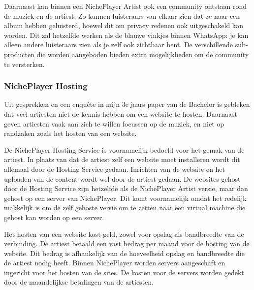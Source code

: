 Daarnaast kan binnen een NichePlayer Artist ook een community ontstaan rond de muziek en de artiest. Zo kunnen luisteraars van elkaar zien dat ze naar een album hebben geluisterd, hoewel dit om privacy redenen ook uitgeschakeld kan worden. Dit zal hetzelfde werken als de blauwe vinkjes binnen WhatsApp: je kan alleen andere luisteraars zien als je zelf ook zichtbaar bent. De verschillende sub-producten die worden aangeboden bieden extra mogelijkheden om de community te versterken.

\subsubsection*{NichePlayer Hosting}
Uit gesprekken en een enquête in mijn 3e jaars paper van de Bachelor is gebleken dat veel artiesten niet de kennis hebben om een website te hosten. Daarnaast geven artiesten vaak aan zich te willen focussen op de muziek, en niet op randzaken zoals het hosten van een website.

De NichePlayer Hosting Service is voornamelijk bedoeld voor het gemak van de artiest. In plaats van dat de artiest zelf een website moet installeren wordt dit allemaal door de Hosting Service gedaan. Inrichten van de website en het uploaden van de content wordt wel door de artiest gedaan. De websites gehost door de Hosting Service zijn hetzelfde als de NichePlayer Artist versie, maar dan gehost op een server van NichePlayer. Dit komt voornamelijk omdat het redelijk makkelijk is om de zelf gehoste versie om te zetten naar een virtual machine die gehost kan worden op een server.

Het hosten van een website kost geld, zowel voor opslag als bandbreedte van de verbinding. De artiest betaald een vast bedrag per maand voor de hosting van de website. Dit bedrag is afhankelijk van de hoeveelheid opslag en bandbreedte die de artiest nodig heeft. Binnen NichePlayer worden servers aangeschaft en ingericht voor het hosten van de sites. De kosten voor de servers worden gedekt door de maandelijkse betalingen van de artiesten.

